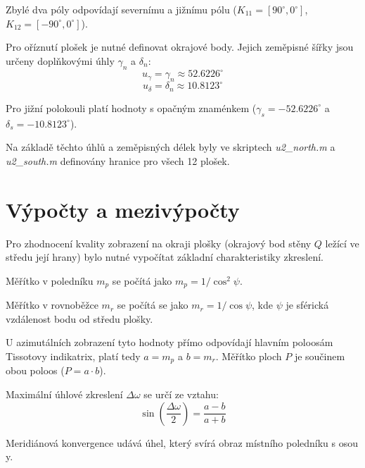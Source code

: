 \documentclass[12pt, a4paper]{article}
\begin{document}
\noindent Zbylé dva póly odpovídají severnímu a jižnímu pólu ($K_{11}=[90^{\circ}, 0^{\circ}]$, $K_{12}=[-90^{\circ}, 0^{\circ}]$). 
\vspace{3mm}

\noindent Pro oříznutí plošek je nutné definovat okrajové body. Jejich zeměpisné šířky jsou určeny doplňkovými úhly $\gamma_n$ a $\delta_n$:
$$u_{\gamma} = \gamma_n \approx 52.6226^{\circ}$$
$$u_{\delta} = \delta_n \approx 10.8123^{\circ}$$

\noindent Pro jižní polokouli platí hodnoty s opačným znaménkem ($\gamma_s = -52.6226^{\circ}$ a $\delta_s = -10.8123^{\circ}$).
\vspace{3mm}

\noindent Na základě těchto úhlů a zeměpisných délek byly ve skriptech \textit{u2\_north.m} a \textit{u2\_south.m} definovány hranice pro všech 12 plošek.

\newpage
\section{Výpočty a mezivýpočty}
Pro zhodnocení kvality zobrazení na okraji plošky (okrajový bod stěny $Q$ ležící ve středu její hrany) bylo nutné vypočítat základní charakteristiky zkreslení.
\vspace{3mm}

\noindent Měřítko v poledníku $m_p$ se počítá jako $m_p = 1 / \cos^2 \psi$.
\vspace{3mm}

\noindent Měřítko v rovnoběžce $m_r$ se počítá se jako $m_r = 1 / \cos \psi$, kde $\psi$ je sférická vzdálenost bodu od středu plošky. 
\vspace{3mm}

\noindent U azimutálních zobrazení tyto hodnoty přímo odpovídají hlavním poloosám Tissotovy indikatrix, platí tedy $a = m_p$ a $b = m_r$. Měřítko ploch $P$ je součinem obou poloos ($P = a \cdot b$).
\vspace{3mm}

\noindent Maximální úhlové zkreslení $\Delta \omega$ se určí ze vztahu:
$$\sin \left( \frac{\Delta \omega}{2} \right) = \frac{a - b}{a + b}$$
\vspace{3mm}

\noindent Meridiánová konvergence udává úhel, který svírá obraz místního poledníku s osou y.
\end{document}
